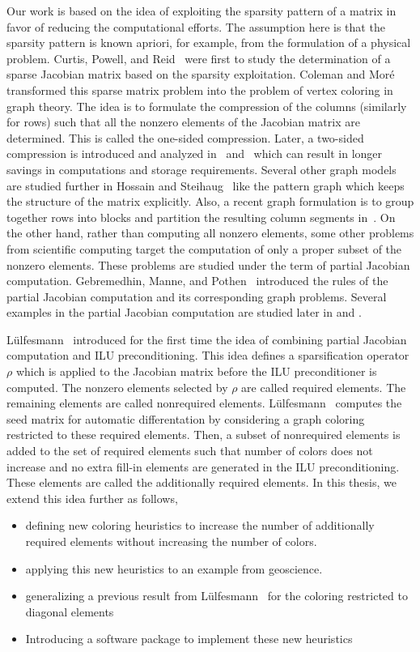 \documentclass[12pt, twoside,a4paper,toc=bibliography]{scrbook}
\begin{document}
Our work is based on the idea of exploiting the sparsity pattern of a matrix in favor of 
reducing the computational efforts. The assumption here is that the sparsity pattern is
known apriori, for example, from the formulation of a physical problem.
Curtis, Powell, and Reid~\cite{Curtis1974117} were first to study the determination of 
a sparse Jacobian matrix based on the sparsity exploitation.
Coleman and Mor{\'e}~\cite{Coleman1983EoS} transformed this sparse matrix problem
into the problem of vertex coloring in graph theory. The idea is to formulate
the compression of the columns (similarly for rows) such that all the nonzero elements of the Jacobian matrix
are determined. This is called the one-sided compression.
Later, a two-sided compression is introduced and analyzed in~\cite{Coleman1996SaE}
and~\cite{hs:csj} which can result in longer savings in computations and storage requirements.
Several other graph models are studied further in Hossain and Steihaug~\cite{hs:gmei} 
like the pattern graph which keeps the structure of the matrix explicitly.
Also, a recent graph formulation is to group together rows into blocks 
and partition the resulting column segments in~\cite{optimal_diret_determination}.
On the other hand, rather than computing all nonzero elements,
some other problems from scientific computing target the computation
of only a proper subset of the nonzero elements.
These problems are studied under the term of partial Jacobian computation.
Gebremedhin, Manne, and Pothen~\cite{Gebremedhin05whatcolor} introduced
the rules of the partial Jacobian computation and its corresponding graph problems. 
Several examples in the partial Jacobian computation are studied later in
\cite{CalotoiuMaster} and \cite{LulfesmannMaster}. 

Lülfesmann~\cite{Lulfesmann2012Fap} introduced for the first time
the idea of combining partial Jacobian computation and ILU preconditioning.
This idea defines a sparsification operator $\rho$ which is applied to the Jacobian matrix
before the ILU preconditioner is computed. The nonzero elements selected by $\rho$
are called required elements. The remaining elements are called nonrequired elements.
Lülfesmann~\cite{Lulfesmann2012Fap} computes the seed matrix for automatic differentation
by considering a graph coloring restricted to these required elements.
Then, a subset of nonrequired elements is added to the set of required elements
such that number of colors does not increase and no extra fill-in elements are generated 
in the ILU preconditioning. These elements are called the additionally required elements.
In this thesis, we extend this idea further as follows,
\begin{itemize}
\item defining new coloring heuristics
to increase the number of additionally required elements without increasing the number of colors.
\item applying this new heuristics to an example from geoscience.
\item generalizing a previous result from Lülfesmann~\cite{Lulfesmann2012Fap} for the coloring restricted to diagonal elements
\item Introducing a software package to implement these new heuristics
\end{itemize}
\end{document}
